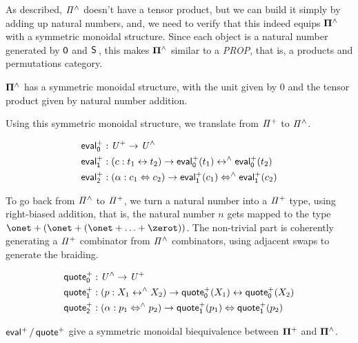 As described, $\mathit{{\Pi}^{\wedge}}$ doesn't have a tensor product, but we can build it simply by adding up natural numbers, and,
we need to verify that this indeed equips $\mathbf{\Pi^{\wedge}}$ with a symmetric monoidal structure. Since each object is a
natural number generated by $\operatorname{\mathsf{0}}$ and $\suc$, this makes $\mathbf{\Pi^{\wedge}}$ similar to a \emph{PROP}, that is, a products and
permutations category.

\begin{proposition}
  $\mathbf{\Pi^{\wedge}}$ has a symmetric monoidal structure, with the unit given by 0 and the tensor product given by natural
  number addition.
\end{proposition}

Using this symmetric monoidal structure, we translate from $\mathit{{\Pi}^{+}}$ to $\mathit{{\Pi}^{\wedge}}$.

\begin{definition}
  \begin{align*}
    \evalp_{0} & : \UPlus \to \UHat                                                          \\
    \evalp_{1} & : (c : t_{1} \iso t_{2}) \to \evalp_{0}(t_{1}) \isoh \evalp_{0}(t_{2})      \\
    \evalp_{2} & : (\alpha : c_{1} \Iso c_{2}) \to \evalp_{1}(c_{1}) \Isoh \evalp_{1}(c_{2})
  \end{align*}
\end{definition}

To go back from $\mathit{{\Pi}^{\wedge}}$ to $\mathit{{\Pi}^{+}}$, we turn a natural number into a $\mathit{{\Pi}^{+}}$ type, using right-biased
addition, that is, the natural number $n$ gets mapped to the type $\onet + (\onet + (\onet + \ldots + \zerot))$. The
non-trivial part is coherently generating a $\mathit{{\Pi}^{+}}$ combinator from $\mathit{{\Pi}^{\wedge}}$ combinators, using adjacent swaps
to generate the braiding.

\begin{definition}
  \begin{align*}
    \quotep_{0} & : \UHat \to \UPlus                                                            \\
    \quotep_{1} & : (p : X_{1} \isoh X_{2}) \to \quotep_{0}(X_{1}) \iso \quotep_{0}(X_{2})      \\
    \quotep_{2} & : (\alpha : p_{1} \Isoh p_{2}) \to \quotep_{1}(p_{1}) \Iso \quotep_{1}(p_{2})
  \end{align*}
\end{definition}

\begin{proposition}
  $\evalp/\quotep$ give a symmetric monoidal biequivalence between $\mathbf{\Pi^{+}}$ and $\mathbf{\Pi^{\wedge}}$.
\end{proposition}


